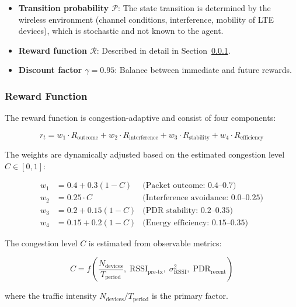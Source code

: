 \documentclass[12pt,a4paper]{article}
\begin{document}
\begin{itemize}
    \item \textbf{Transition probability $\mathcal{P}$}: The state transition is determined by the wireless environment (channel conditions, interference, mobility of LTE devices), which is stochastic and not known to the agent.

    \item \textbf{Reward function $\mathcal{R}$}: Described in detail in Section~\ref{sec:reward}.

    \item \textbf{Discount factor $\gamma = 0.95$}: Balance between immediate and future rewards.
\end{itemize}

\subsubsection{Reward Function}
\label{sec:reward}

The reward function is congestion-adaptive and consist of four components:

\begin{equation}
    r_t = w_1 \cdot R_{\text{outcome}} + w_2 \cdot R_{\text{interference}} + w_3 \cdot R_{\text{stability}} + w_4 \cdot R_{\text{efficiency}}
    \label{eq:reward_function}
\end{equation}

The weights are dynamically adjusted based on the estimated congestion level $C \in [0, 1]$:

\begin{align}
    w_1 &= 0.4 + 0.3(1 - C) & \text{(Packet outcome: 0.4--0.7)} \\
    w_2 &= 0.25 \cdot C & \text{(Interference avoidance: 0.0--0.25)} \\
    w_3 &= 0.2 + 0.15(1 - C) & \text{(PDR stability: 0.2--0.35)} \\
    w_4 &= 0.15 + 0.2(1 - C) & \text{(Energy efficiency: 0.15--0.35)}
\end{align}

The congestion level $C$ is estimated from observable metrics:

\begin{equation}
    C = f\left(\frac{N_{\text{devices}}}{T_{\text{period}}},\; \text{RSSI}_{\text{pre-tx}},\; \sigma^2_{\text{RSSI}},\; \text{PDR}_{\text{recent}}\right)
    \label{eq:congestion}
\end{equation}

where the traffic intensity $N_{\text{devices}}/T_{\text{period}}$ is the primary factor.
\end{document}

